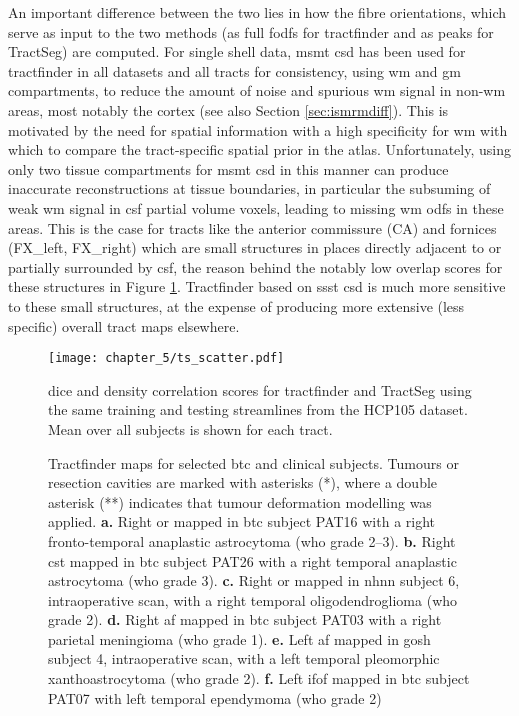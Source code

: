 An important difference between the two lies in how the fibre orientations, which serve as input to the two methods (as full \glspl{fodf} for tractfinder and as peaks for TractSeg) are computed.
For single shell data, \gls{msmt} \gls{csd} has been used for tractfinder in all datasets and all tracts for consistency, using \gls{wm} and \gls{gm} compartments, to reduce the amount of noise and spurious \gls{wm} signal in non-\gls{wm} areas, most notably the cortex (see also Section \ref{sec:ismrmdiff}).
This is motivated by the need for spatial information with a high specificity for \gls{wm} with which to compare the tract-specific spatial prior in the atlas.
Unfortunately, using only two tissue compartments for \gls{msmt} \gls{csd} in this manner can produce inaccurate reconstructions at tissue boundaries, in particular the subsuming of weak \gls{wm} signal in \gls{csf} partial volume voxels, leading to missing \gls{wm} \glspl{odf} in these areas.
This is the case for tracts like the anterior commissure (CA) and fornices (FX\_left, FX\_right) which are small structures in places directly adjacent to or partially surrounded by \gls{csf}, the reason behind the notably low overlap scores for these structures in Figure \ref{fig:ts_all_tracts}.
Tractfinder based on \gls{ssst} \gls{csd} is much more sensitive to these small structures, at the expense of producing more extensive (less specific) overall tract maps elsewhere.

\begin{figure}[h!]
  \texttt{[image: chapter\_5/ts\_scatter.pdf]}
  \caption{\gls{dice} and density correlation scores for tractfinder and TractSeg using the same training and testing streamlines from the HCP105 dataset. Mean over all subjects is shown for each tract.}
  \label{fig:ts_all_tracts}
\end{figure}

\begin{figure}
  
  \caption{Tractfinder maps for selected \gls{btc} and clinical subjects. Tumours or resection cavities are marked with asterisks (*), where a double asterisk (**) indicates that tumour deformation modelling was applied.
  \textbf{a.} Right \gls{or} mapped in \gls{btc} subject PAT16 with a right fronto-temporal anaplastic astrocytoma (\gls{who} grade 2--3).
  \textbf{b.} Right \gls{cst} mapped in \gls{btc} subject PAT26 with a right temporal anaplastic astrocytoma (\gls{who} grade 3).
  \textbf{c.} Right \gls{or} mapped in \gls{nhnn} subject 6, intraoperative scan, with a right temporal oligodendroglioma (\gls{who} grade 2).
  \textbf{d.} Right \gls{af} mapped in \gls{btc} subject PAT03 with a right parietal meningioma (\gls{who} grade 1).
  \textbf{e.} Left \gls{af} mapped in \gls{gosh} subject 4, intraoperative scan, with a left temporal pleomorphic xanthoastrocytoma (\gls{who} grade 2).
  \textbf{f.} Left \gls{ifof} mapped in \gls{btc} subject PAT07 with left temporal ependymoma (\gls{who} grade 2)}
  \label{fig:tumours}
\end{figure}

